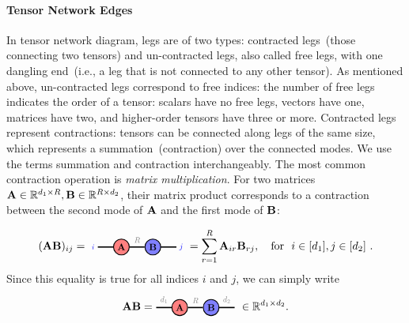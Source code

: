 \paragraph{Tensor Network Edges}\label{subsec:contraction} In tensor network diagram, legs are of two types: contracted legs~(those connecting two tensors) and un-contracted legs, also called free legs, with one dangling end~(i.e., a leg that is not connected to any other tensor). As mentioned above, un-contracted legs correspond to free indices:  the number of free legs indicates the order of a tensor: scalars have no free legs, vectors have one, matrices have two, and higher-order tensors have three or more.  Contracted legs represent contractions: 
tensors can be connected along legs of the same size, which represents a summation~(contraction) over the connected modes. 
We use the terms summation and contraction interchangeably. The most common contraction operation is \textit{matrix multiplication}. For two matrices $\mathbf{A}\in\mathbb{R}^{d_1\times R}, \mathbf{B}\in\mathbb{R}^{R\times d_2}$, their matrix product corresponds to a contraction between the second mode of $\mathbf{A}$ and the first mode of $\mathbf{B}$:

\begin{align}\label{eq:matrix-product}
(\Ab\Bb)_{ij} 
=
\begin{tikzpicture}[baseline=\baseline]
   \tikzset{tensor/.style = {minimum size = 0.5cm,shape = circle,thick,draw=black,inner sep = 0pt}, edge/.style = {thick,line width=.4mm},every loop/.style={}}
    \def\y{0}
    \def\x{0}
    \node[tensor,fill=red!50!white] (A) at (\x,\y){\scalebox{0.85}{$\Ab$}};
    \node[tensor,fill=blue!50!white] (B) at (\x+1,\y){\scalebox{0.85}{$\Bb$}};
    \draw[edge] (A) -- (B) node [above,midway] {\scalebox{0.7}{\dimcolor{$R$}}};
    \draw[edge] (\x-0.25,\y) -- (\x-0.75,\y)  node [pos=1.3] {\scalebox{0.7} {\indcolor{$i$}}};
    \draw[edge] (\x+1.25,\y) -- (\x+1.75,\y)  node [pos=1.3] {\scalebox{0.7}{\indcolor{$j$}}};
    \end{tikzpicture}
= \sum_{r=1}^R\Ab_{ir}\Bb_{rj},\ \ \ \text{for}\ \ i\in[d_1],j\in[d_2]\ .
\end{align}
Since this equality is true for all indices $i$ and $j$, we can simply write
\begin{align}\label{eq:matrix-product_noidx}
\Ab\Bb 
=
\begin{tikzpicture}[baseline=\baseline]
   \tikzset{tensor/.style = {minimum size = 0.5cm,shape = circle,thick,draw=black,inner sep = 0pt}, edge/.style = {thick,line width=.4mm},every loop/.style={}}
    \def\y{0}
    \def\x{0}
    \node[tensor,fill=red!50!white] (A) at (\x,\y){\scalebox{0.85}{$\Ab$}};
    \node[tensor,fill=blue!50!white] (B) at (\x+1,\y){\scalebox{0.85}{$\Bb$}};
    \draw[edge] (A) -- (B) node [above,midway] {\scalebox{0.7}{\dimcolor{$R$}}};
    \draw[edge] (\x-0.25,\y) -- (\x-0.75,\y)  node [midway, above] {\scalebox{0.7}{\dimcolor{$d_1$}}};
    \draw[edge] (\x+1.25,\y) -- (\x+1.75,\y)  node [midway,above] {\scalebox{0.7}{\dimcolor{$d_2$}}};
    \end{tikzpicture}
 \ \in \mathbb R^{d_1\times d_2}.
\end{align}

